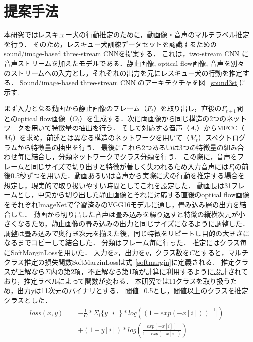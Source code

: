 \documentclass[MIRU,submit]{miru2019j}
\begin{document}
\section{提案手法}
本研究ではレスキュー犬の行動推定のために，動画像・音声のマルチラベル推定を行う．
そのため，レスキュー犬訓練データセットを認識するためのsound/image-based three-stream CNNを提案する．
これは，two-stream CNN に音声ストリームを加えたモデルである．静止画像, optical flow画像, 音声を別々のストリームへの入力とし，それぞれの出力を元にレスキュー犬の行動を推定する．
Sound/image-based three-stream CNN のアーキテクチャを図~\ref{sound3st}に示す．

まず入力となる動画から静止画像のフレーム（$F_t$）を取り出し，直後の$F_{t+1}$間とのoptical flow画像（$O_t$）を生成する．次に両画像から同じ構造の2つのネットワークを用いて特徴量の抽出を行う．
そして対応する音声（$A_t$）からMFCC（$M_t$）を求め，前述とは異なる構造のネットワークを用いて（$M_t$）スペクトログラムから特徴量の抽出を行う．
最後にこれら2つあるいは3つの特徴量の組み合わせ毎に結合し，分類ネットワークでクラス分類を行う．
この際に，音声をフレームと同じサイズで切り出すと特徴が著しく失われるため入力音声には$F_t$の前後0.5秒ずつを用いた．動画あるいは音声から実際に犬の行動を推定する場合を想定し，現実的で取り扱いやすい時間としてこれを設定した．
動画長は31フレームとし，中央から切り出した静止画像とそれに対応する直後のoptical flow画像をそれぞれImageNetで学習済みのVGG16モデルに通し，畳み込み層の出力を結合した．
動画から切り出した音声は畳み込みを繰り返すと特徴の縦横次元が小さくなるため，静止画像の畳み込みの出力と同じサイズになるように調整した．
調整は畳み込みで奥行き次元を揃えた後，同じ特徴をリピートし目的の大きさになるまでコピーして結合した．
分類はフレーム毎に行った．
推定にはクラス毎にSoftMarginLossを用いた．
入力を$x$，出力を$y$，クラス数を$C$とすると，マルチクラス推定の損失関数SoftMarginLossは式~\ref{softmargin}に定義される．
推定クラスが正解なら$\Sigma$内の第2項，不正解なら第1項が計算に利用するように設計されており，推定ラベルによって関数が変わる．
本研究では11クラスを取り扱うため，出力yは11次元のバイナリとする．
閾値=0.5とし，閾値以上のクラスを推定クラスとした．
\begin{equation}
    \label{softmargin}
    \begin{split}
    loss(x, y) = &-\frac{1}{C} * \Sigma_{i} \{y[i]\} * log((1+exp(-x[i]))^{-1}])\\
    &+ (1 - y[i]) * log(\frac{exp(-x[i])}{1+exp(-x[i])})
    \end{split}
\end{equation}
\end{document}
